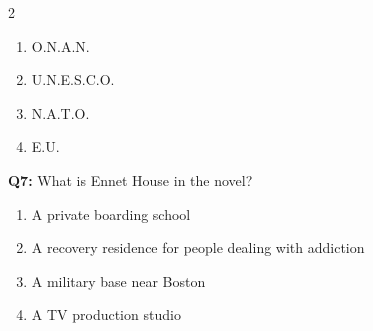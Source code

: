 \documentclass[10pt]{article}
\begin{document}
\begin{multicols}{2}
\begin{enumerate}[label=\arabic*.]
\item O.N.A.N.
\item U.N.E.S.C.O.
\item N.A.T.O.
\item E.U.
\end{enumerate}
\textbf{Q7:} What is Ennet House in the novel?

\begin{enumerate}[label=\arabic*.]
\item A private boarding school
\item A recovery residence for people dealing with addiction
\item A military base near Boston
\item A TV production studio
\end{enumerate}
\end{multicols}
\end{document}
